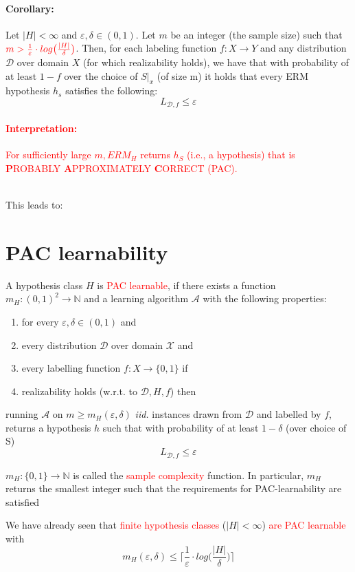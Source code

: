 \documentclass[10pt,a4paper]{article}
\theoremstyle{definition}
\theoremstyle{plain}
\begin{document}
\paragraph{Corollary:} Let $|H| < \infty$ and $\varepsilon, \delta \in (0,1)$. Let $m$ be an integer (the sample size) such that $\color{red} m>\frac{1}{\varepsilon} \cdot log \big(\frac{|H|}{\delta}\big)$. Then, for each labeling function $f: X \to Y$ and any distribution $\mathcal{D}$ over domain $X$ (for which realizability holds), we have that with probability of at least $1-f$ over the choice of $S|_x$ (of size m) it holds that every ERM hypothesis $h_s$ satisfies the following:
$$ L_{\mathcal{D},f} \leq \varepsilon $$

\textcolor{red}{\paragraph{Interpretation:} For sufficiently large $m, ERM_H$ returns $h_S$ (i.e., a hypothesis) that is \textbf{P}ROBABLY \textbf{A}PPROXIMATELY \textbf{C}ORRECT (PAC).}\\
\newline
This leads to:
\section*{PAC learnability}
\begin{boxeddef}
	A hypothesis class $H$ is \textcolor{red}{PAC learnable}, if there exists a function $m_H: (0,1)^2 \to \mathbb{N}$ and a learning algorithm $\mathcal{A}$ with the following properties:
	\begin{enumerate}
		\item for every $\varepsilon, \delta \in (0,1)$ and
		\item every distribution $\mathcal{D}$ over domain $\mathcal{X}$ and
		\item every labelling function $f: X \to \{0, 1\}$ if
		\item realizability holds (w.r.t. to $\mathcal{D}, H, f$) then
	\end{enumerate}
	running $\mathcal{A}$ on $m \geq m_H(\varepsilon, \delta)$ \textit{iid.} instances drawn from $\mathcal{D}$ and labelled by $f$, returns a hypothesis $h$ such that with probability of at least $1-\delta$ (over choice of S) 
	$$ L_{\mathcal{D}, f} \leq \varepsilon $$
\end{boxeddef}
\begin{boxedsubdef}
	$m_H: \{0,1\} \to \mathbb{N}$ is called the \textcolor{red}{sample complexity} function. In particular, $m_H$ returns the smallest integer such that the requirements for PAC-learnability are satisfied
\end{boxedsubdef}
We have already seen that \textcolor{red}{finite hypothesis classes} ($|H| < \infty$) \textcolor{red}{are PAC learnable} with 
$$ m_H(\varepsilon, \delta) \leq \bigg\lceil\frac{1}{\varepsilon} \cdot log \bigg( \frac{|H|}{\delta}\bigg) \bigg\rceil $$
\end{document}
